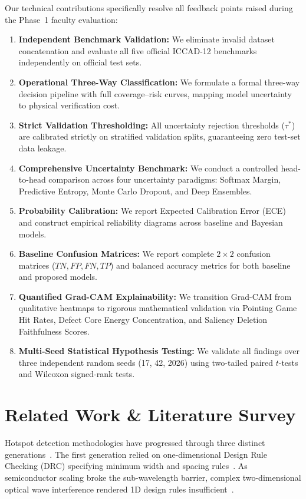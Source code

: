 \documentclass[11pt,journal,onecolumn]{IEEEtran}
\begin{document}
Our technical contributions specifically resolve all feedback points raised during the Phase~1 faculty evaluation:
\begin{enumerate}
    \item \textbf{Independent Benchmark Validation:} We eliminate invalid dataset concatenation and evaluate all five official ICCAD-12 benchmarks independently on official test sets.
    \item \textbf{Operational Three-Way Classification:} We formulate a formal three-way decision pipeline with full coverage--risk curves, mapping model uncertainty to physical verification cost.
    \item \textbf{Strict Validation Thresholding:} All uncertainty rejection thresholds ($\tau^*$) are calibrated strictly on stratified validation splits, guaranteeing zero test-set data leakage.
    \item \textbf{Comprehensive Uncertainty Benchmark:} We conduct a controlled head-to-head comparison across four uncertainty paradigms: Softmax Margin, Predictive Entropy, Monte Carlo Dropout, and Deep Ensembles.
    \item \textbf{Probability Calibration:} We report Expected Calibration Error (ECE) and construct empirical reliability diagrams across baseline and Bayesian models.
    \item \textbf{Baseline Confusion Matrices:} We report complete $2 \times 2$ confusion matrices ($TN, FP, FN, TP$) and balanced accuracy metrics for both baseline and proposed models.
    \item \textbf{Quantified Grad-CAM Explainability:} We transition Grad-CAM from qualitative heatmaps to rigorous mathematical validation via Pointing Game Hit Rates, Defect Core Energy Concentration, and Saliency Deletion Faithfulness Scores.
    \item \textbf{Multi-Seed Statistical Hypothesis Testing:} We validate all findings over three independent random seeds (17, 42, 2026) using two-tailed paired $t$-tests and Wilcoxon signed-rank tests.
\end{enumerate}

\section{Related Work \& Literature Survey}
Hotspot detection methodologies have progressed through three distinct generations~\cite{yang2019lithography}. The first generation relied on one-dimensional Design Rule Checking (DRC) specifying minimum width and spacing rules~\cite{torres2002integrated}. As semiconductor scaling broke the sub-wavelength barrier, complex two-dimensional optical wave interference rendered 1D design rules insufficient~\cite{gupta2003manufacturing}.
\end{document}
